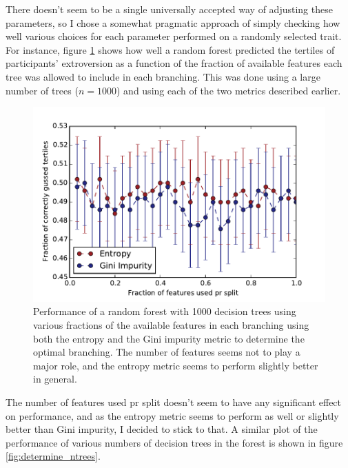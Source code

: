 There doesn't seem to be a single universally accepted way of adjusting these parameters, so I chose a somewhat pragmatic approach of simply checking how well various choices for each parameter performed on a randomly selected trait. For instance, figure \ref{fig:determine_max_features} shows how well a random forest predicted the tertiles of participants' extroversion as a function of the fraction of available features each tree was allowed to include in each branching. This was done using a large number of trees ($n = 1000$) and using each of the two metrics described earlier.
\begin{figure}
	\includegraphics[width=\figwidth]{pics/ml/max_features_pr_split.pdf}
	\caption{Performance of a random forest with 1000 decision trees using various fractions of the available features in each branching using both the {\color{moerkeroed}entropy} and the {\color{oldhat}Gini impurity} metric to determine the optimal branching. The number of features seems not to play a major role, and the {\color{moerkeroed}entropy} metric seems to perform slightly better in general.}
	\label{fig:determine_max_features}
\end{figure}
The number of features used pr split doesn't seem to have any significant effect on performance, and as the entropy metric seems to perform as well or slightly better than Gini impurity, I decided to stick to that. A similar plot of the performance of various numbers of decision trees in the forest is shown in figure \ref{fig:determine_ntrees}.
